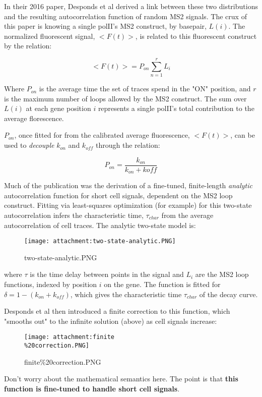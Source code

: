 \documentclass[11pt]{article}
\makeatletter
\def\maxwidth{\ifdim\Gin@nat@width>\linewidth\linewidth
    \else\Gin@nat@width\fi}
\let\Oldincludegraphics\includegraphics
\renewcommand{\includegraphics}[1]{\Oldincludegraphics[width=.8\maxwidth]{#1}}
\makeatother
\begin{document}
In their 2016 paper, Desponds et al derived a link between these two
distributions and the resulting autocorrelation function of random MS2
signals. The crux of this paper is knowing a single polII's MS2
construct, by basepair, \(L(i)\). The normalized fluorescent signal,
\(<F(t)>\), is related to this fluorescent construct by the relation:

\[<F(t)> = P_{on}\sum_{n=1}^{r} L_i \]

Where \(P_{on}\) is the average time the set of traces spend in the "ON"
position, and \(r\) is the maximum number of loops allowed by the MS2
construct. The sum over \(L(i)\) at each gene position \(i\) represents
a single polII's total contribution to the average florescence.

\(P_{on}\), once fitted for from the calibrated average fluorescence,
\(<F(t)>\), can be used to \emph{decouple} \(k_{on}\) and \(k_{off}\)
through the relation:

\[P_{on} = \frac{k_{on}}{k_{on} + k{off}} \]

Much of the publication was the derivation of a fine-tuned,
finite-length \emph{analytic} autocorrelation function for short cell
signals, dependent on the MS2 loop construct. Fitting via least-squares
optimization (for example) for this two-state autocorrelation infers the
characteristic time, \(\tau_{char}\) from the average autocorrelation of
cell traces. The analytic two-state model is:

\begin{figure}
\centering
\texttt{[image: attachment:two-state-analytic.PNG]}
\caption{two-state-analytic.PNG}
\end{figure}

where \(\tau\) is the time delay between points in the signal and
\(L_i\) are the MS2 loop functions, indexed by position \(i\) on the
gene. The function is fitted for \(\delta = 1 - (k_{on} + k_{off})\),
which gives the characteristic time \(\tau_{char}\) of the decay curve.

Desponds et al then introduced a finite correction to this function,
which "smooths out" to the infinite solution (above) as cell signals
increase:

\begin{figure}
\centering
\texttt{[image: attachment:finite\\\%20correction.PNG]}
\caption{finite\%20correction.PNG}
\end{figure}

Don't worry about the mathematical semantics here. The point is that
\textbf{this function is fine-tuned to handle short cell signals}.
\end{document}
